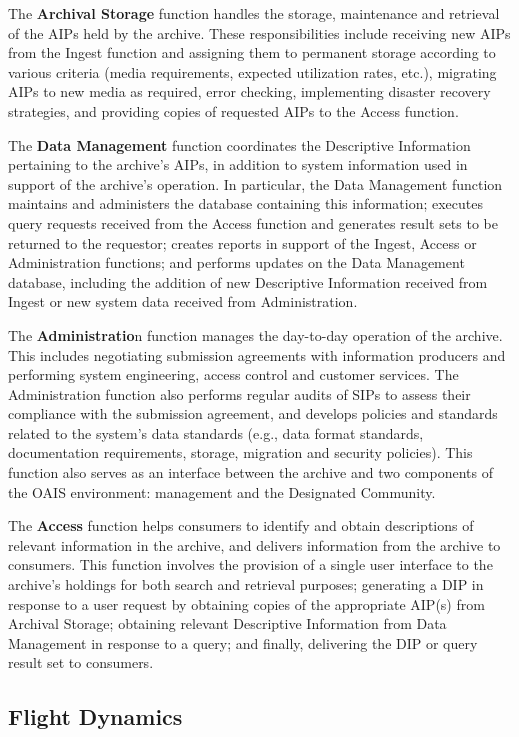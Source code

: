 The \textbf{Archival Storage} function handles the storage, maintenance and retrieval of the AIPs held by the archive. These responsibilities include receiving new AIPs from the Ingest function and assigning them to permanent storage according to various criteria (media requirements, expected utilization rates, etc.), migrating AIPs to new media as required, error checking, implementing disaster recovery strategies, and providing copies of requested AIPs to the Access function.

The \textbf{Data Management} function coordinates the Descriptive Information pertaining to the archive's AIPs, in addition to system information used in support of the archive's operation. In particular, the Data Management function maintains and administers the database containing this information; executes query requests received from the Access function and generates result sets to be returned to the requestor; creates reports in support of the Ingest, Access or Administration functions; and performs updates on the Data Management database, including the addition of new Descriptive Information received from Ingest or new system data received from Administration.

The \textbf{Administratio}n function manages the day-to-day operation of the archive. This includes negotiating submission agreements with information producers and performing system engineering, access control and customer services. The Administration function also performs regular audits of SIPs to assess their compliance with the submission agreement, and develops policies and standards related to the system's data standards (e.g., data format standards, documentation requirements, storage, migration and security policies). This function also serves as an interface between the archive and two components of the OAIS environment: management and the Designated Community.

The \textbf{Access} function helps consumers to identify and obtain descriptions of relevant information in the archive, and delivers information from the archive to consumers. This function involves the provision of a single user interface to the archive's holdings for both search and retrieval purposes; generating a DIP in response to a user request by obtaining copies of the appropriate AIP(s) from Archival Storage; obtaining relevant Descriptive Information from Data Management in response to a query; and finally, delivering the DIP or query result set to consumers.

\subsection{Flight Dynamics}

